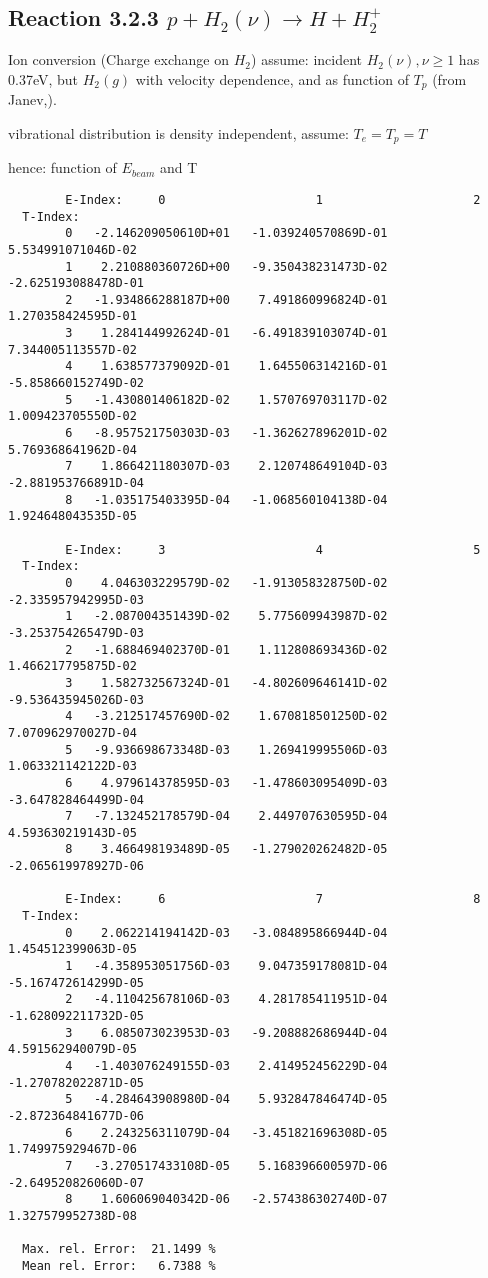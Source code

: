 \documentclass[12pt]{article}
\begin{document}
\subsection{
Reaction 3.2.3  $  p + H_2(\nu) \rightarrow H + H_2^+  $
}
  Ion conversion (Charge exchange on $H_2$)
  assume: incident $H_2(\nu), \nu \ge 1 $ has 0.37eV, but $H_2(g)$
  with velocity dependence, and as function of $T_p$ (from
  Janev,\cite{kn:Janev}).

  vibrational distribution is density independent, assume: $T_e = T_p = T$

  hence: function of $E_{beam}$ and T
\begin{small}\begin{verbatim}
        E-Index:     0                     1                     2
  T-Index:
        0   -2.146209050610D+01   -1.039240570869D-01    5.534991071046D-02
        1    2.210880360726D+00   -9.350438231473D-02   -2.625193088478D-01
        2   -1.934866288187D+00    7.491860996824D-01    1.270358424595D-01
        3    1.284144992624D-01   -6.491839103074D-01    7.344005113557D-02
        4    1.638577379092D-01    1.645506314216D-01   -5.858660152749D-02
        5   -1.430801406182D-02    1.570769703117D-02    1.009423705550D-02
        6   -8.957521750303D-03   -1.362627896201D-02    5.769368641962D-04
        7    1.866421180307D-03    2.120748649104D-03   -2.881953766891D-04
        8   -1.035175403395D-04   -1.068560104138D-04    1.924648043535D-05

        E-Index:     3                     4                     5
  T-Index:
        0    4.046303229579D-02   -1.913058328750D-02   -2.335957942995D-03
        1   -2.087004351439D-02    5.775609943987D-02   -3.253754265479D-03
        2   -1.688469402370D-01    1.112808693436D-02    1.466217795875D-02
        3    1.582732567324D-01   -4.802609646141D-02   -9.536435945026D-03
        4   -3.212517457690D-02    1.670818501250D-02    7.070962970027D-04
        5   -9.936698673348D-03    1.269419995506D-03    1.063321142122D-03
        6    4.979614378595D-03   -1.478603095409D-03   -3.647828464499D-04
        7   -7.132452178579D-04    2.449707630595D-04    4.593630219143D-05
        8    3.466498193489D-05   -1.279020262482D-05   -2.065619978927D-06

        E-Index:     6                     7                     8
  T-Index:
        0    2.062214194142D-03   -3.084895866944D-04    1.454512399063D-05
        1   -4.358953051756D-03    9.047359178081D-04   -5.167472614299D-05
        2   -4.110425678106D-03    4.281785411951D-04   -1.628092211732D-05
        3    6.085073023953D-03   -9.208882686944D-04    4.591562940079D-05
        4   -1.403076249155D-03    2.414952456229D-04   -1.270782022871D-05
        5   -4.284643908980D-04    5.932847846474D-05   -2.872364841677D-06
        6    2.243256311079D-04   -3.451821696308D-05    1.749975929467D-06
        7   -3.270517433108D-05    5.168396600597D-06   -2.649520826060D-07
        8    1.606069040342D-06   -2.574386302740D-07    1.327579952738D-08

  Max. rel. Error:  21.1499 %
  Mean rel. Error:   6.7388 %
\end{verbatim}\end{small}
\end{document}
